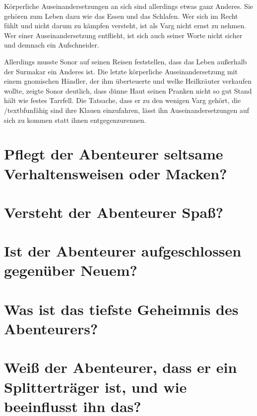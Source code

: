 \documentclass{article}
\begin{document}
	Körperliche Auseinandersetzungen an sich sind allerdings etwas ganz
	Anderes. Sie gehören zum Leben dazu wie das Essen und das Schlafen.
	Wer sich im Recht fühlt und nicht darum zu kämpfen versteht, ist als
	Varg nicht ernst zu nehmen. Wer einer Auseinandersetzung entflieht,
	ist sich auch seiner Worte nicht sicher und demnach ein Aufschneider.

	Allerdings musste Sonor auf seinen Reisen feststellen, dass das Leben
	außerhalb der Surmakar ein Anderes ist. Die letzte körperliche
	Auseinandersetzung mit einem gnomischen Händler, der ihm überteuerte
	und welke Heilkräuter verkaufen wollte, zeigte Sonor deutlich, dass
	dünne Haut seinen Pranken nicht so gut Stand hält wie festes Tarrfell.
	Die Tatsache, dass er zu den wenigen Varg gehört, die /textbf{unfähig}
	sind ihre Klauen einzufahren, lässt ihn Auseinandersetzungen auf sich zu
	kommen statt ihnen entgegenzurennen.


	\section[Macken]{Pflegt der Abenteurer seltsame Verhaltensweisen oder Macken?}



	\section[Humor]{Versteht der Abenteurer Spaß?}
	
	\section[Aufgeschlossenheit]{Ist der Abenteurer aufgeschlossen gegenüber Neuem?}
	
	\section[Top Secret]{Was ist das tiefste Geheimnis des Abenteurers?}
	
	\section[Splitter]{Weiß der Abenteurer, dass er ein Splitterträger ist, und wie beeinflusst ihn das?}
\end{document}
